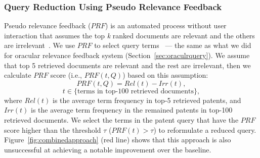 \subsubsection{Query Reduction Using Pseudo Relevance Feedback}
Pseudo relevance feedback ($\mathit{PRF}$) is an automated process without user interaction that assumes the top \textit{k} ranked documents are relevant and the others are irrelevant~\citep{Baeza-Yates2011}. We use $\mathit{PRF}$ to select query terms~\citep{maxwell2013compact} --- the same as what we did for oracular relevance feedback system (Section~\ref{sec:oraculrquery}). We assume that top 5 retrieved documents are relevant and the rest are irrelevant, then we calculate $\mathit{PRF}$ score (i.e., $PRF(t,Q)$) based on this assumption:  
\begin{equation}
PRF(t,Q)=Rel(t)-Irr(t), 
 \label{eq:score-prf}
\end{equation}
\vspace*{-2ex}
\begin{displaymath}t\in \lbrace \mbox{terms in top-100 retrieved documents}\rbrace,\end{displaymath}
where $\mathit{Rel(t)}$ is the average term frequency in top-5 retrieved patents, and $\mathit{Irr(t)}$ is
the average term frequency in the remained patents in top-100 retrieved documents.
We select the terms in the patent query that have the $\mathit{PRF}$ score higher than the threshold $\tau$ ($PRF(t)>\tau$) to reformulate a reduced query. Figure~\ref{fig:combinedapproach} (red line) shows that this approach is also unsuccessful at achieving a notable improvement over the baseline.
